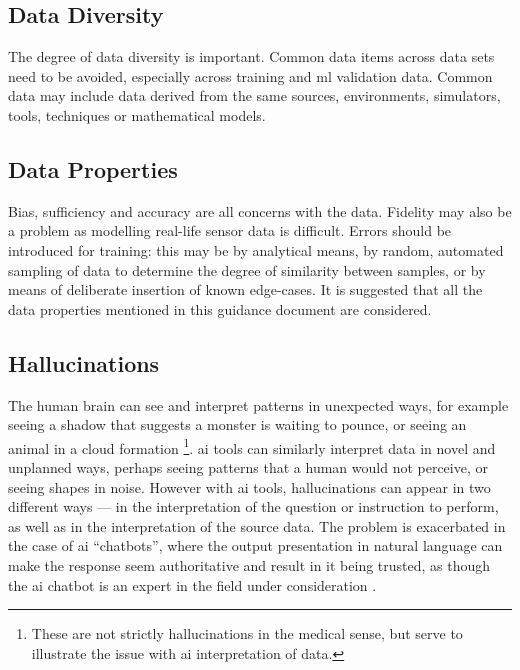 \subsection{Data Diversity}
The degree of data diversity is important. Common data items across data sets need to be avoided, especially across training and
\gls{ml}
validation data. Common data may include data derived from the same sources, environments, simulators, tools, techniques or mathematical models.

\subsection{Data Properties}
Bias, sufficiency and accuracy are all concerns with the data. Fidelity may also be a problem as modelling real-life sensor data is difficult.  Errors should be introduced for training: this may be by analytical means, by random, automated sampling of data to determine the degree of similarity between samples, or by means of deliberate insertion of known edge-cases. 
It is suggested that all the data properties mentioned in this guidance document are considered.

\subsection{Hallucinations}
\label{bkm:MachineLearning:Hallucinations}
%
The human brain can see and interpret patterns in unexpected ways, for example seeing a shadow that
suggests a monster is waiting to pounce, or seeing an animal in a cloud formation%
\footnote{These are not strictly hallucinations in the medical sense, but serve to illustrate
the issue with \gls{ai} interpretation of data.}.
\Gls{ai} tools can similarly interpret data in novel and unplanned ways, perhaps seeing patterns that a
human would not perceive, or seeing shapes in noise. However with \gls{ai} tools, hallucinations can appear
in two different ways --- in the interpretation of the question or instruction to perform, as well as
in the interpretation of the source data.
The problem is exacerbated in the case of \gls{ai} ``chatbots'', where the output presentation in natural
language can make the response seem authoritative and result in it being trusted, as though the
\gls{ai} chatbot is an expert in the field under consideration \cite{citation:chatbotsterrible:website}. 

